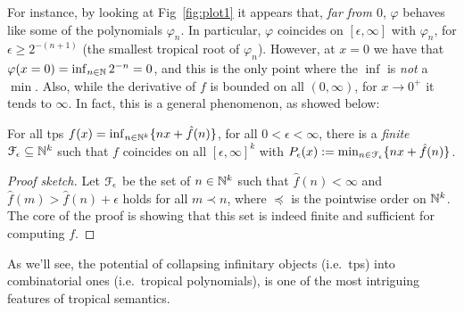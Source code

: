 For instance, by looking at Fig~\ref{fig:plot1} it appears that, \emph{far from $0$}, $\varphi$ behaves like some of the polynomials $\varphi_{n}$.
In particular, %
$\varphi$ coincides on $[\epsilon,\infty]$ with $\varphi_{n}$,
for $\epsilon \geq 2^{-(n+1)}$ (the smallest tropical root of $\varphi_{n}$).
However, at
%
 $x=0$ we have that $\varphi(x=0)=\inf_{n\in\mathbb{N}} 2^{-n}=0$, and this is the only point where the $\inf$ is \emph{not} a $\min$.
Also, while the derivative of $f$ is bounded on all $(0,\infty)$, for $x\to 0^+$ it tends to $\infty$.
In fact, this is a general phenomenon, as showed below:
% 

\begin{theorem}\label{theorem:fepsilon}
For all tps $f(x)=\inf_{n\in \mathbb N^{k}}\{n x+\hat{f}(n)\}$, for all $0<\epsilon<\infty$, there is a \emph{finite} $\mathcal{F}_\epsilon \subseteq \mathbb{N}^k$ such that 
% 
$f$ coincides on all $[\epsilon,\infty]^k$ with $P_\epsilon( x):=\min_{n\in \mathcal{F}_\epsilon}\{n x+\hat{f}(n)\}$.
\end{theorem}
\begin{proof}[Proof sketch]
Let $\mathcal{F}_\epsilon$ be the set of $n\in\mathbb{N}^{k}$ such that 
$\widehat f(n)<\infty$ and $\widehat f(m)> \widehat f(n)+\epsilon$ holds for all $m\prec n$, where $\preceq$ is the pointwise order on $\mathbb{N}^k$.
The core of the proof is showing that this set is indeed finite and sufficient for computing $f$.
\end{proof}

As we'll see, the potential of collapsing infinitary objects (i.e.~tps) into combinatorial ones (i.e.~tropical polynomials), is one of the most intriguing features of tropical semantics. 

%

